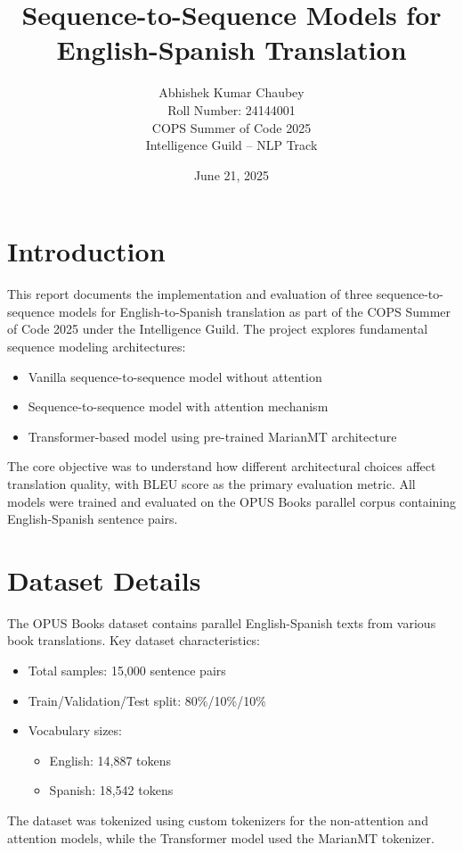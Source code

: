\documentclass[12pt]{article}
\title{\textbf{Sequence-to-Sequence Models for English-Spanish Translation}}
\author{Abhishek Kumar Chaubey \\
Roll Number: 24144001 \\
COPS Summer of Code 2025 \\
Intelligence Guild – NLP Track}
\date{June 21, 2025}
\begin{document}
\maketitle

\tableofcontents
\newpage

\section{Introduction}
This report documents the implementation and evaluation of three sequence-to-sequence models for English-to-Spanish translation as part of the COPS Summer of Code 2025 under the Intelligence Guild. The project explores fundamental sequence modeling architectures:

\begin{itemize}
    \item Vanilla sequence-to-sequence model without attention
    \item Sequence-to-sequence model with attention mechanism
    \item Transformer-based model using pre-trained MarianMT architecture
\end{itemize}

The core objective was to understand how different architectural choices affect translation quality, with BLEU score as the primary evaluation metric. All models were trained and evaluated on the OPUS Books parallel corpus containing English-Spanish sentence pairs.

\section{Dataset Details}
The OPUS Books dataset contains parallel English-Spanish texts from various book translations. Key dataset characteristics:

\begin{itemize}
    \item Total samples: 15,000 sentence pairs
    \item Train/Validation/Test split: 80\%/10\%/10\%
    \item Vocabulary sizes: 
        \begin{itemize}
            \item English: 14,887 tokens
            \item Spanish: 18,542 tokens
        \end{itemize}
\end{itemize}

The dataset was tokenized using custom tokenizers for the non-attention and attention models, while the Transformer model used the MarianMT tokenizer.
\end{document}
